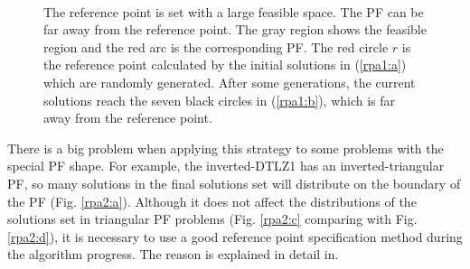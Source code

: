 \documentclass[conference]{IEEEtran}
\begin{document}
\begin{figure}[!t]
  \centering
  \quad
  \\
  \caption{The reference point is set with a large feasible space.
  The PF can be far away from the reference point.
  The gray region shows the feasible region and the red arc is the corresponding PF.
  The red circle $r$ is the reference point calculated by the initial solutions in (\ref{rpa1:a})
  which are randomly generated. 
  After some generations, the current solutions reach the seven black circles in (\ref{rpa1:b}), 
  which is far away from the reference point.}
  \label{rpa1}
\end{figure}

There is a big problem when applying this strategy to some problems with the special PF shape. 
For example, the inverted-DTLZ1\cite{invertedDTLZ1} has an inverted-triangular PF, 
so many solutions in the final solutions set will distribute on the boundary of the PF
(Fig. \ref{rpa2:a})\cite{hisao:RPexplanation, hisao:RPspecify, hisao:dynamic}. 
Although it does not affect the distributions of the solutions set 
in triangular PF problems 
(Fig. \ref{rpa2:c} comparing with Fig. \ref{rpa2:d}), 
it is necessary to use a good reference point specification method during the algorithm progress.
The reason is explained in detail in\cite{hisao:RPexplanation}.
\end{document}
